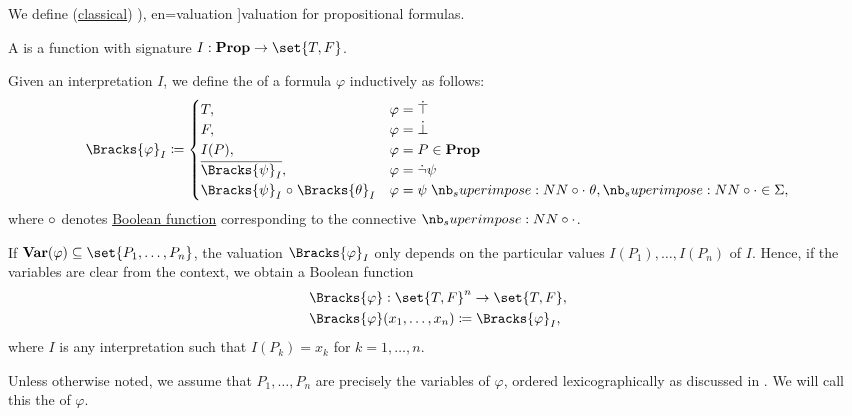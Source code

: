 \begin{definition}\label{def:propositional_valuation}\mimprovised
  We define (\hyperref[def:classical_logic]{classical}) \term[ru=значение истинности (формулы) (\cite[8]{Эдельман1975}), en=valuation \cite[def. 1.2.1]{VanDalen2004}]{valuation} for propositional formulas.

  \begin{thmenum}
     A  is a function with signature \( I: \boldop{Prop} \to \set{ T, F } \).

     Given an interpretation \( I \), we define the  of a formula \( \varphi \) inductively as follows:
    \begin{equation}\label{eq:def:propositional_valuation/formula_valuation}
      \Bracks{\varphi}_I \coloneqq \begin{cases}
        T,                                         &\varphi = \syntop \\
        F,                                         &\varphi = \synbot \\
        I(P),                                      &\varphi = P \in \boldop{Prop} \\
        \oline{\Bracks{\psi}_I},                   &\varphi = \synneg \psi \\
        \Bracks{\psi}_I \relcirc \Bracks{\theta}_I &\varphi = \psi \syncirc \theta, {\syncirc} \in \Sigma,
      \end{cases}
    \end{equation}
    where \( \relcirc \) denotes \hyperref[def:standard_boolean_functions]{Boolean function} corresponding to the connective \( \syncirc \).

     If \( \boldop{Var}(\varphi) \subseteq \set{ P_1, \ldots, P_n } \), the valuation \( \Bracks{\varphi}_I \) only depends on the particular values \( I(P_1), \ldots, I(P_n) \) of \( I \). Hence, if the variables are clear from the context, we obtain a Boolean function
    \begin{equation*}
      \begin{aligned}
        &\Bracks{\varphi}: \set{ T, F }^n \to \set{ T, F }, \\
        &\Bracks{\varphi}(x_1, \ldots, x_n) \coloneqq \Bracks{\varphi}_I,
      \end{aligned}
    \end{equation*}
    where \( I \) is any interpretation such that \( I(P_k) = x_k \) for \( k = 1, \ldots, n \).

    Unless otherwise noted, we assume that \( P_1, \ldots, P_n \) are precisely the variables of \( \varphi \), ordered lexicographically as discussed in . We will call this the  of \( \varphi \).
  \end{thmenum}
\end{definition}
